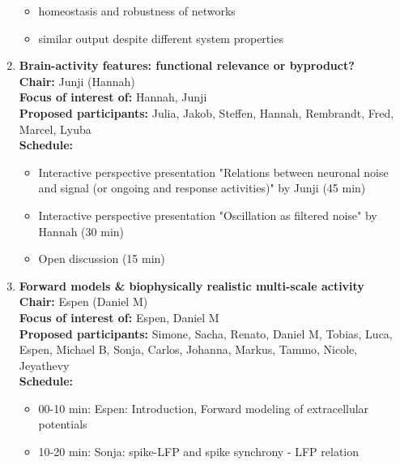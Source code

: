 \documentclass[10pt, a4paper,twoside,american]{article}
\begin{document}
\begin{enumerate}[resume]
\begin{itemize}
  \item homeostasis and robustness of networks
  \item similar output despite different system properties
  \end{itemize}
\item {\large\bf Brain-activity features: functional relevance or byproduct?}\\[1ex]
  {\bf Chair:} Junji (Hannah)\\[1ex]
  {\bf Focus of interest of:} Hannah, Junji\\[1ex]
  {\bf Proposed participants:} Julia, Jakob, Steffen, Hannah, Rembrandt, Fred, Marcel, Lyuba\\[1ex]
  {\bf Schedule:}
  \begin{itemize}
  \item Interactive perspective presentation "Relations between neuronal noise and signal (or ongoing and response activities)" by Junji (45 min)
  \item Interactive perspective presentation "Oscillation as filtered noise" by Hannah (30 min)
  \item Open discussion (15 min)
  \end{itemize}
\item {\large\bf Forward models \& biophysically realistic multi-scale activity}\\[1ex]
  {\bf Chair:} Espen (Daniel M)\\[1ex]
  {\bf Focus of interest of:} Espen, Daniel M\\[1ex]
  {\bf Proposed participants:} Simone, Sacha, Renato, Daniel M, Tobias, Luca, Espen, Michael B, Sonja, Carlos, Johanna, Markus, Tammo, Nicole, Jeyathevy\\[1ex]
  {\bf Schedule:}
  \begin{itemize}
  \item 00-10 min: Espen: Introduction, Forward modeling of extracellular potentials
  \item 10-20 min: Sonja: spike-LFP and spike synchrony - LFP relation

\end{itemize}
\end{enumerate}
\end{document}
